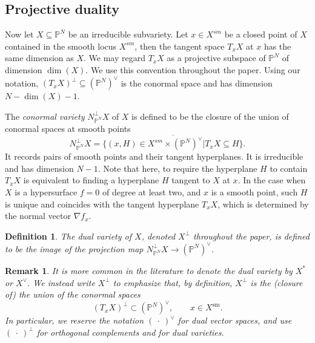 \documentclass[12pt]{amsart}
\newtheorem{definition}[theorem]{Definition}
\newtheorem{remark}[theorem]{Remark}
\begin{document}
\subsection{Projective duality}

Now let $X\subseteq \mathbb P^{N}$ be an irreducible subvariety. Let $x\in X^{sm}$ be a closed point of $X$ contained in the smooth locus $X^{sm}$, then the tangent space $T_xX$ at $x$ has the same dimension as $X$. We may regard $T_xX$ as a projective subspace of $\mathbb P^{N}$ of dimension $\dim(X)$. We use this convention throughout the paper. Using our notation, $(T_xX)^{\perp}\subseteq (\mathbb P^N)^{\vee}$ is the conormal space and has dimension $N-\dim(X)-1$.

The \textit{conormal variety} $N_{\mathbb P^N}^{\perp}X$ of $X$ is defined to be the closure of the union of conormal spaces at smooth points \cite{HK85}
\begin{equation}\label{eqn_conormal}
    N_{\mathbb P^N}^{\perp}X=\overline{\{(x,H)\in X^{sm}\times (\mathbb P^{N})^{\vee}| T_xX\subseteq H\}}.
\end{equation}
It records pairs of smooth points and their tangent hyperplanes.
It is irreducible and has dimension $N-1$. Note that here, to require the hyperplane $H$ to contain $T_xX$ is equivalent to finding a hyperplane $H$ tangent to $X$ at $x$. In the case when $X$ is a hypersurface $f=0$ of degree at least two, and $x$ is a smooth point, such $H$ is unique and coincides with the tangent hyperplane $T_xX$, which is determined by the normal vector $\nabla f_x$.

\begin{definition}\normalfont
   The \textit{dual variety} of $X$, denoted $X^{\perp}$ throughout the paper, is defined to be the image of the projection map $N_{\mathbb P^N}^{\perp}X\to (\mathbb P^{N})^{\vee}$. %
\end{definition}

\begin{remark}\normalfont It is more common in the literature to denote the dual variety by $X^*$ or $X^{\vee}$. We instead write $X^{\perp}$ to emphasize that, by definition, $X^{\perp}$ is the (closure of) the union of the conormal spaces
\[
 (T_x X)^{\perp} \subset (\mathbb P^N)^{\vee}, \qquad x \in X^{\mathrm{sm}}.
\]
In particular, we reserve the notation $(\ \cdot\ )^{\vee}$ for dual vector spaces, and use $(\ \cdot\ )^{\perp}$ for orthogonal complements and for dual varieties.
\end{remark}
\end{document}
